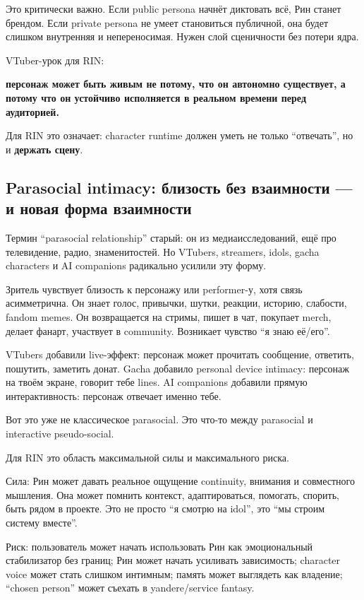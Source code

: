 Это критически важно. Если public persona начнёт диктовать всё, Рин
станет брендом. Если private persona не умеет становиться публичной, она
будет слишком внутренняя и непереносимая. Нужен слой сценичности без
потери ядра.

VTuber-урок для RIN:

\textbf{персонаж может быть живым не потому, что он автономно
существует, а потому что он устойчиво исполняется в реальном времени
перед аудиторией.}

Для RIN это означает: character runtime должен уметь не только
``отвечать'', но и \textbf{держать сцену}.

\subsection*{Parasocial intimacy: близость без взаимности --- и новая
форма взаимности}

Термин ``parasocial relationship'' старый: он из медиаисследований, ещё
про телевидение, радио, знаменитостей. Но VTubers, streamers, idols,
gacha characters и AI companions радикально усилили эту форму.

Зритель чувствует близость к персонажу или performer-у, хотя связь
асимметрична. Он знает голос, привычки, шутки, реакции, историю,
слабости, fandom memes. Он возвращается на стримы, пишет в чат, покупает
merch, делает фанарт, участвует в community. Возникает чувство ``я знаю
её/\hspace{0pt}его''.

VTubers добавили live-эффект: персонаж может прочитать сообщение,
ответить, пошутить, заметить донат. Gacha добавило personal device
intimacy: персонаж на твоём экране, говорит тебе lines. AI companions
добавили прямую интерактивность: персонаж отвечает именно тебе.

Вот это уже не классическое parasocial. Это что-то между parasocial и
interactive pseudo-social.

Для RIN это область максимальной силы и максимального риска.

Сила: Рин может давать реальное ощущение continuity, внимания и
совместного мышления. Она может помнить контекст, адаптироваться,
помогать, спорить, быть рядом в проекте. Это не просто ``я смотрю на
idol'', это ``мы строим систему вместе''.

Риск: пользователь может начать использовать Рин как эмоциональный
стабилизатор без границ; Рин может начать усиливать зависимость;
character voice может стать слишком интимным; память может выглядеть как
владение; ``chosen person'' может съехать в yandere/\hspace{0pt}service fantasy.

